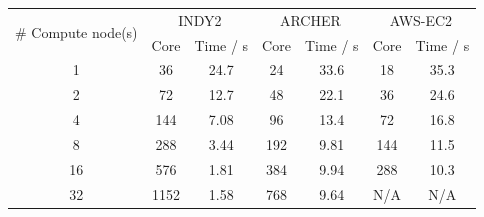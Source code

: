 \begin{center}

\label{table:perf}

\begin{tabular}{|c|c|c|c|c|c|c|}
\hline
\multirow{2}{*}{\# Compute node(s)} & \multicolumn{2}{c|}{INDY2} & \multicolumn{2}{c|}{ARCHER} & \multicolumn{2}{c|}{AWS-EC2} \\ \cline{2-7} 
                                  & Core       & Time / s      & Core       & Time / s       & Core        & Time / s       \\ \hline
1                                 & 36         & 24.7          & 24         & 33.6           & 18          & 35.3           \\
2                                 & 72         & 12.7          & 48         & 22.1           & 36          & 24.6           \\
4                                 & 144        & 7.08          & 96         & 13.4           & 72          & 16.8           \\
8                                 & 288        & 3.44          & 192        & 9.81           & 144         & 11.5           \\
16                                 & 576        & 1.81          & 384        & 9.94           & 288         & 10.3           \\
32                                 & 1152       & 1.58          & 768        & 9.64           & N/A         & N/A            \\ \hline
\end{tabular}

\end{center}



\vspace{0.5cm}


